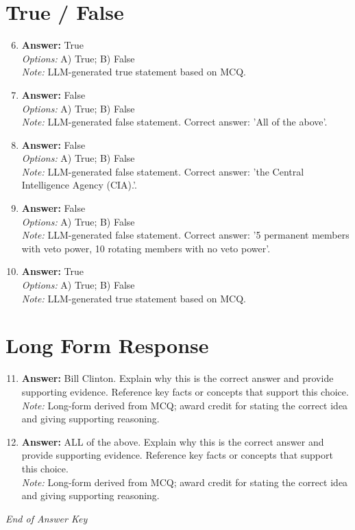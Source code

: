 \documentclass[12pt]{article}
\begin{document}
\section*{True / False}
\begin{enumerate}[label=\arabic*.]
\setcounter{enumi}{5}
\item \textbf{Answer:} True
\\ \textit{Options:} A) True; B) False
\\ \textit{Note:} LLM-generated true statement based on MCQ.
\item \textbf{Answer:} False
\\ \textit{Options:} A) True; B) False
\\ \textit{Note:} LLM-generated false statement. Correct answer: 'All of the above'.
\item \textbf{Answer:} False
\\ \textit{Options:} A) True; B) False
\\ \textit{Note:} LLM-generated false statement. Correct answer: 'the Central Intelligence Agency (CIA).'.
\item \textbf{Answer:} False
\\ \textit{Options:} A) True; B) False
\\ \textit{Note:} LLM-generated false statement. Correct answer: '5 permanent members with veto power, 10 rotating members with no veto power'.
\item \textbf{Answer:} True
\\ \textit{Options:} A) True; B) False
\\ \textit{Note:} LLM-generated true statement based on MCQ.
\end{enumerate}

\section*{Long Form Response}
\begin{enumerate}[label=\arabic*.]
\setcounter{enumi}{10}
\item \textbf{Answer:} Bill Clinton. Explain why this is the correct answer and provide supporting evidence. Reference key facts or concepts that support this choice.
\\ \textit{Note:} Long-form derived from MCQ; award credit for stating the correct idea and giving supporting reasoning.
\item \textbf{Answer:} ALL of the above. Explain why this is the correct answer and provide supporting evidence. Reference key facts or concepts that support this choice.
\\ \textit{Note:} Long-form derived from MCQ; award credit for stating the correct idea and giving supporting reasoning.
\end{enumerate}

\vfill
\noindent\textit{End of Answer Key}
\end{document}
